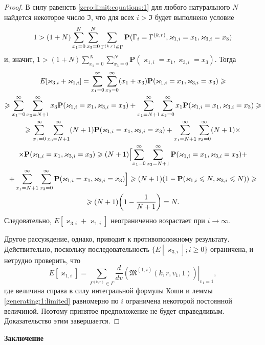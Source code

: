 \documentclass[a4paper,twoside]{article}
\newcommand{\header}[1]{\bigskip\medskip\noindent\textbf{#1}\nopagebreak\bigskip}
\theoremstyle{theorem}
\theoremstyle{remark}
\renewcommand*{\hm}[1]{#1\nobreak\discretionary{}%
	{\hbox{$\mathsurround=0pt #1$}}{}}%
\renewcommand{\Pr}{{\mathbf P}}
\begin{document}
\begin{proof}
В силу равенств \eqref{zero:limit:equations:1} для любого натурального $N$ найдется некоторое число $\mathfrak{I}$, что для всех $i > \mathfrak{I}$ будет выполнено условие
$$1 > (1+N) \sum_{x_1=0}^{N}\sum_{x_3=0}^{N} \sum_{\Gamma^{(k,r)}\in \Gamma}  \Pr(\Gamma_{i}=\Gamma^{(k,r)}, \varkappa_{1,i} \hm{} = x_1, \varkappa_{3,i}=x_3)$$
и, значит, $1 >(1+N) \sum_{x_1=0}^{N}\sum_{x_3=0}^{N} \Pr(\varkappa_{1,i} = x_1, \varkappa_{3,i}=x_3)$. Тогда
\begin{multline*}
E[\varkappa_{3,i}+\varkappa_{1,i}] = \sum_{x_1=0}^{\infty}\sum_{x_3=0}^{\infty} (x_1 + x_3) \Pr(\varkappa_{1,i} = x_1, \varkappa_{3,i}=x_3) \geqslant \\
\geqslant
 \sum_{x_1=0}^{\infty}\sum_{x_3=N+1}^{\infty} x_3 \Pr(\varkappa_{1,i} = x_1, \varkappa_{3,i}=x_3) +  \sum_{x_1=N+1}^{\infty}\sum_{x_3=0}^{\infty} x_1 \Pr(\varkappa_{1,i} = x_1, \varkappa_{3,i}=x_3) \geqslant \\
 \geqslant
  \sum_{x_1=0}^{\infty}\sum_{x_3=N+1}^{\infty} (N+1) \Pr(\varkappa_{1,i} = x_1, \varkappa_{3,i}=x_3) + \sum_{x_1=N+1}^{\infty}\sum_{x_3=0}^{\infty} (N+1) \times \\ \times \Pr(\varkappa_{1,i} = x_1, \varkappa_{3,i}=x_3)
  \geqslant
  (N+1)\Bigl[\sum_{x_1=0}^{\infty}\sum_{x_3=N+1}^{\infty} \Pr(\varkappa_{1,i} = x_1, \varkappa_{3,i}=x_3) + \\+ \sum_{x_1=N+1}^{\infty}\sum_{x_3=0}^{\infty}\Pr(\varkappa_{1,i} = x_1, \varkappa_{3,i}=x_3)\Bigr] 
  \geqslant (N+1)(1-\Pr(\varkappa_{1,i} \leqslant N, \varkappa_{3,i} \leqslant N)  ) 
  \geqslant \\ \geqslant
  (N+1)\biggl(1-\frac{1}{N+1}\biggr) = N.
\end{multline*}
Следовательно, $E[\varkappa_{3,i}+\varkappa_{1,i}]$ неограниченно возрастает при $i \to \infty$. 

Другое рассуждение, однако, приводит к противоположному результату. Действительно, поскольку последовательность $\{E[\varkappa_{3,i}]; i \geqslant 0\}$ ограничена, и нетрудно проверить, что
$$
E[\varkappa_{1,i}] =\sum_{\Gamma^{(k,r)}\in \Gamma} \frac{d}{dv}\left.\left(\mathfrak{M}^{(1,i)}(k,r,v_1,1)\right)\right|_{v_1=1},
$$
где величина справа в силу интегральной формулы Коши и леммы \ref{generating:1:limited} равномерно по $i$ ограничена некоторой постоянной величиной. 
 Поэтому принятое предположение не будет справедливым. Доказательство этим завершается.
\end{proof}



\header{Заключение}
\end{document}
